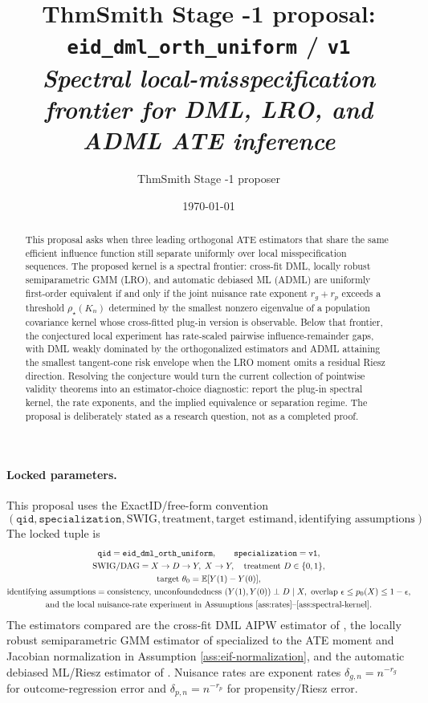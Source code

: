 \documentclass[11pt]{article}
\title{ThmSmith Stage -1 proposal: \texttt{eid\_dml\_orth\_uniform} / \texttt{v1}%
  \\ \large\textit{Spectral local-misspecification frontier for DML, LRO, and ADML ATE inference}}
\author{ThmSmith Stage -1 proposer}
\date{\today}
\newcommand{\E}{\mathbb{E}}
\theoremstyle{definition}
\theoremstyle{plain}
\theoremstyle{remark}
\begin{document}
\maketitle


\paragraph{Locked parameters.}
This proposal uses the ExactID/free-form convention
\[
(\texttt{qid},\texttt{specialization},\text{SWIG},\text{treatment},
\text{target estimand},\text{identifying assumptions}).
\]
The locked tuple is
\[
\begin{gathered}
\texttt{qid}=\texttt{eid\_dml\_orth\_uniform},\qquad
\texttt{specialization}=\texttt{v1},\\
\text{SWIG/DAG}=X\to D\to Y,\; X\to Y,\quad
\text{treatment }D\in\{0,1\},\\
\text{target } \theta_0=\E[Y(1)-Y(0)],\\
\text{identifying assumptions}=\text{consistency, unconfoundedness }
(Y(1),Y(0))\perp D\mid X,\text{ overlap } \epsilon\le p_0(X)\le 1-\epsilon,\\
\text{and the local nuisance-rate experiment in Assumptions \ref{ass:rates}--\ref{ass:spectral-kernel}.}
\end{gathered}
\]
The estimators compared are the cross-fit DML AIPW estimator of
\citet{ChernozhukovEtAl2018DML}, the locally robust semiparametric GMM estimator
of \citet{ChernozhukovEscancianoIchimuraNeweyRobins2022LRO} specialized to the
ATE moment and Jacobian normalization in Assumption \ref{ass:eif-normalization},
and the automatic debiased ML/Riesz estimator of
\citet{ChernozhukovNeweySingh2022ADML}.  Nuisance rates are exponent rates
\(\delta_{g,n}=n^{-r_g}\) for outcome-regression error and
\(\delta_{p,n}=n^{-r_p}\) for propensity/Riesz error.

\begin{abstract}
This proposal asks when three leading orthogonal ATE estimators that share the
same efficient influence function still separate uniformly over local
misspecification sequences.  The proposed kernel is a spectral frontier:
cross-fit DML, locally robust semiparametric GMM (LRO), and automatic debiased
ML (ADML) are uniformly first-order equivalent if and only if the joint nuisance
rate exponent \(r_g+r_p\) exceeds a threshold \(\rho_\star(K_n)\) determined by
the smallest nonzero eigenvalue of a population covariance kernel whose
cross-fitted plug-in version is observable.
Below that frontier, the conjectured local experiment has rate-scaled pairwise
influence-remainder gaps, with DML weakly dominated by the orthogonalized
estimators and ADML attaining the smallest tangent-cone risk envelope when the
LRO moment omits a residual Riesz direction.  Resolving the conjecture would turn
the current collection of pointwise validity theorems into an estimator-choice
diagnostic: report the plug-in spectral kernel, the rate exponents, and the
implied equivalence or separation regime.  The proposal is deliberately stated as a
research question, not as a completed proof.
\end{abstract}
\end{document}

